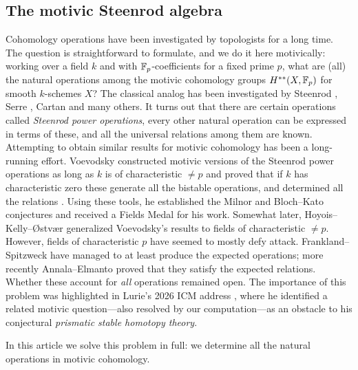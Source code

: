 \documentclass{amsart}
\renewcommand{\NB}[1]{}
\numberwithin{proposition}{section}
\numberwithin{equation}{section}
\begin{document}
\subsection{The motivic Steenrod algebra}
Cohomology operations have been investigated by topologists for a long time.
The question is straightforward to formulate, and we do it here motivically: working over a field $k$ and with $\mathbb{F}_p$-coefficients for a fixed prime $p$, what are (all) the natural operations among the motivic cohomology groups $H^{**}(X, \mathbb{F}_p)$ for smooth $k$-schemes $X$?
The classical analog has been investigated by Steenrod \cite{steenrod1952reduced}, Serre \cite{Serre:em}, Cartan \cite{Cartan:em} and many others.
It turns out that there are certain operations called \emph{Steenrod power operations}, every other natural operation can be expressed in terms of these, and all the universal relations among them are known.
Attempting to obtain similar results for motivic cohomology has been a long-running effort.
Voevodsky constructed motivic versions of the Steenrod power operations as long as $k$ is of characteristic $\ne p$ \cite{voevodsky2003reduced} and proved that if $k$ has characteristic zero these generate all the bistable operations, and determined all the relations \cite{voevodsky2010motivic}.
Using these tools, he established the Milnor and Bloch--Kato conjectures \cite{voevodsky2003motivic,voevodsky-BK} and received a Fields Medal for his work.\NB{Chronology: the Fields Medal was awarded in 2002, before the published Bloch--Kato proof.}
Somewhat later, Hoyois--Kelly--{\O}stv{\ae}r generalized Voevodsky's results to fields of characteristic $\ne p$.
However, fields of characteristic $p$ have seemed to mostly defy attack.
Frankland--Spitzweck \cite{frankland-spitzweck} have managed to at least produce the expected operations; more recently Annala--Elmanto \cite{annala-elmanto} proved that they satisfy the expected relations. Whether these account for \emph{all} operations remained open.
The importance of this problem was highlighted in Lurie's 2026 ICM address \cite[Remark~9.5]{lurie-prismatic}, where he identified a related motivic question---also resolved by our computation---as an obstacle to his conjectural \emph{prismatic stable homotopy theory}.

In this article we solve this problem in full: we determine all the natural operations in motivic cohomology.
\end{document}
